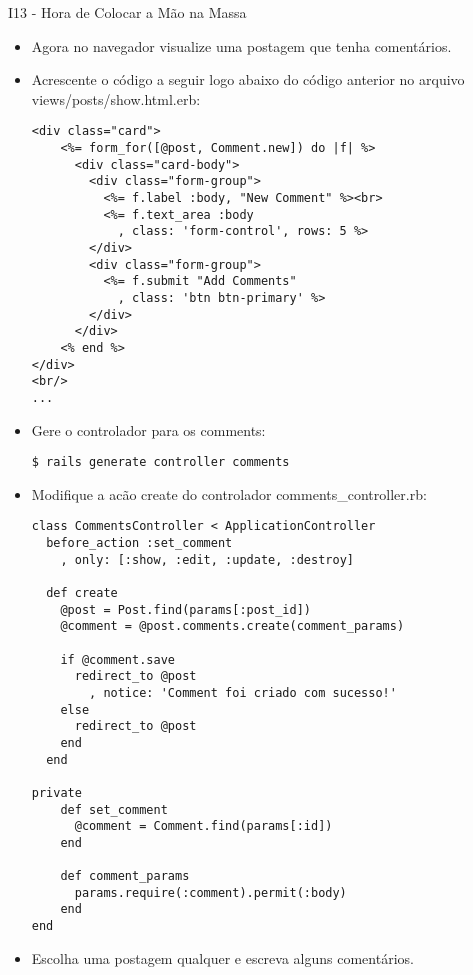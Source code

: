 \begin{frame}{I13 - Hora de Colocar a Mão na Massa}
\begin{itemize}
	\item Agora no navegador visualize uma postagem que tenha comentários.
	\item Acrescente o código a seguir logo abaixo do código anterior no arquivo \alert{views/posts/show.html.erb}:
	\begin{lstlisting}[style=RubyInputStyle]
<div class="card">
    <%= form_for([@post, Comment.new]) do |f| %>
      <div class="card-body">
        <div class="form-group">
          <%= f.label :body, "New Comment" %><br>
          <%= f.text_area :body
            , class: 'form-control', rows: 5 %>
        </div>
        <div class="form-group">
          <%= f.submit "Add Comments"
            , class: 'btn btn-primary' %>
        </div>
      </div>
    <% end %>
</div>
<br/>
...
 \end{lstlisting}

\item Gere o controlador para os comments:
		\begin{lstlisting}[style=BashInputBasicStyle]
			$ rails generate controller comments
		\end{lstlisting}
		
\item Modifique a acão create do controlador \alert{comments\_controller.rb}:
\begin{lstlisting}[style=RubyInputStyle, caption=controllers/comments\_controller.rb]
class CommentsController < ApplicationController
  before_action :set_comment
    , only: [:show, :edit, :update, :destroy]

  def create
    @post = Post.find(params[:post_id])
    @comment = @post.comments.create(comment_params)

    if @comment.save
      redirect_to @post
        , notice: 'Comment foi criado com sucesso!'
    else
      redirect_to @post
    end
  end

private
    def set_comment
      @comment = Comment.find(params[:id])
    end

    def comment_params
      params.require(:comment).permit(:body)
    end
end
\end{lstlisting}

\item Escolha uma postagem qualquer e escreva alguns comentários.

	\end{itemize}
\end{frame}